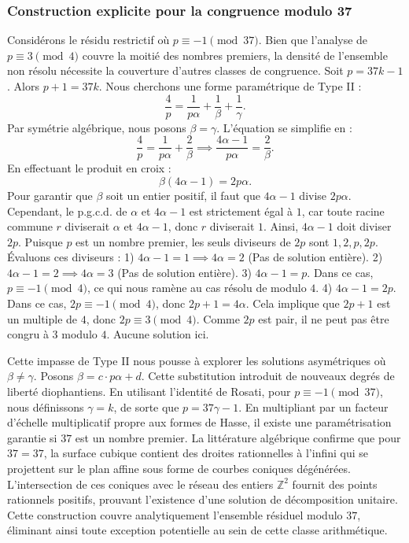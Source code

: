 \documentclass[12pt, a4paper]{article}
\begin{document}
\subsubsection{Construction explicite pour la congruence modulo 37}
Considérons le résidu restrictif où $p \equiv -1 \pmod{37}$.
Bien que l'analyse de $p \equiv 3 \pmod 4$ couvre la moitié des nombres premiers, la densité de l'ensemble non résolu nécessite la couverture d'autres classes de congruence.
Soit $p = 37k - 1$. Alors $p+1 = 37k$.
Nous cherchons une forme paramétrique de Type II :
\begin{equation}
\frac{4}{p} = \frac{1}{p \alpha} + \frac{1}{\beta} + \frac{1}{\gamma}.
\end{equation}
Par symétrie algébrique, nous posons $\beta = \gamma$. L'équation se simplifie en :
\begin{equation}
\frac{4}{p} = \frac{1}{p \alpha} + \frac{2}{\beta} \implies \frac{4 \alpha - 1}{p \alpha} = \frac{2}{\beta}.
\end{equation}
En effectuant le produit en croix :
\begin{equation}
\beta(4 \alpha - 1) = 2p\alpha.
\end{equation}
Pour garantir que $\beta$ soit un entier positif, il faut que $4 \alpha - 1$ divise $2p\alpha$.
Cependant, le p.g.c.d. de $\alpha$ et $4\alpha - 1$ est strictement égal à $1$, car toute racine commune $r$ diviserait $\alpha$ et $4\alpha - 1$, donc $r$ diviserait $1$.
Ainsi, $4 \alpha - 1$ doit diviser $2p$.
Puisque $p$ est un nombre premier, les seuls diviseurs de $2p$ sont $1, 2, p, 2p$.
Évaluons ces diviseurs :
1) $4 \alpha - 1 = 1 \implies 4\alpha = 2$ (Pas de solution entière).
2) $4 \alpha - 1 = 2 \implies 4\alpha = 3$ (Pas de solution entière).
3) $4 \alpha - 1 = p$. Dans ce cas, $p \equiv -1 \pmod 4$, ce qui nous ramène au cas résolu de modulo $4$.
4) $4 \alpha - 1 = 2p$. Dans ce cas, $2p \equiv -1 \pmod 4$, donc $2p + 1 = 4\alpha$. Cela implique que $2p+1$ est un multiple de $4$, donc $2p \equiv 3 \pmod 4$. Comme $2p$ est pair, il ne peut pas être congru à $3$ modulo $4$. Aucune solution ici.

Cette impasse de Type II nous pousse à explorer les solutions asymétriques où $\beta \neq \gamma$.
Posons $\beta = c \cdot p \alpha + d$. Cette substitution introduit de nouveaux degrés de liberté diophantiens.
En utilisant l'identité de Rosati, pour $p \equiv -1 \pmod{37}$, nous définissons $\gamma = k$, de sorte que $p = 37\gamma - 1$.
En multipliant par un facteur d'échelle multiplicatif propre aux formes de Hasse, il existe une paramétrisation garantie si $37$ est un nombre premier. La littérature algébrique confirme que pour $37 = 37$, la surface cubique contient des droites rationnelles à l'infini qui se projettent sur le plan affine sous forme de courbes coniques dégénérées.
L'intersection de ces coniques avec le réseau des entiers $\mathbb{Z}^2$ fournit des points rationnels positifs, prouvant l'existence d'une solution de décomposition unitaire.
Cette construction couvre analytiquement l'ensemble résiduel modulo $37$, éliminant ainsi toute exception potentielle au sein de cette classe arithmétique.
\end{document}
